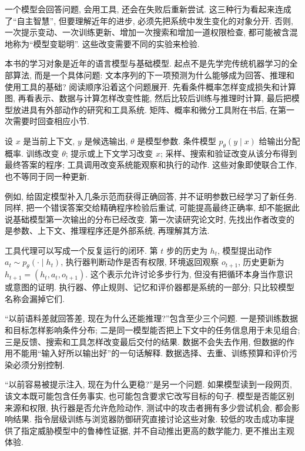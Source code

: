 \label{ch:route}
一个模型会回答问题, 会用工具, 还会在失败后重新尝试. 这三种行为看起来连成了“自主智慧”, 但要理解近年的进步, 必须先把系统中发生变化的对象分开. 否则, 一次提示变动、一次训练更新、增加一次搜索和增加一道权限检查, 都可能被含混地称为“模型变聪明”. 这些改变需要不同的实验来检验.

本书的学习对象是近年的语言模型与基础模型. 起点不是先学完传统机器学习的全部算法, 而是一个具体问题: 文本序列的下一项预测为什么能够成为回答、推理和使用工具的基础? 阅读顺序沿着这个问题展开. 先看条件概率怎样变成损失和计算图, 再看表示、数据与计算怎样改变性能, 然后比较后训练与推理时计算, 最后把模型放进具有外部动作的研究和工具系统. 矩阵、概率和微分工具附在书后, 在第一次需要时回查相应小节.

\begin{definition}
设 $x$ 是当前上下文, $y$ 是候选输出, $\theta$ 是模型参数. 条件模型 $p_\theta(y\mid x)$ 给输出分配概率. 训练改变 $\theta$; 提示或上下文学习改变 $x$; 采样、搜索和验证改变从该分布得到最终答案的程序; 工具调用改变系统能观察和执行的动作. 这些对象即使联合工作, 也不等同于同一种更新.
\end{definition}
例如, 给固定模型补入几条示范而获得正确回答, 并不证明参数已经学习了新任务. 同样, 把一个错误答案交给精确程序检验后重试, 可能提高最终正确率, 却不能据此说基础模型第一次输出的分布已经改变. 第一次读研究论文时, 先找出作者改变的是参数、上下文、推理程序还是外部系统, 再理解其方法.

工具代理可以写成一个反复运行的闭环. 第 $t$ 步的历史为 $h_t$, 模型提出动作 $a_t\sim p_\theta(\cdot\mid h_t)$, 执行器判断动作是否有权限, 环境返回观察 $o_{t+1}$, 历史更新为 $h_{t+1}=(h_t,a_t,o_{t+1})$. 这个表示允许讨论多步行为, 但没有把循环本身当作意识或意图的证明. 执行器、停止规则、记忆和评价器都是系统的一部分; 只比较模型名称会漏掉它们.

“以前语料差就回答差, 现在为什么还能推理?”包含至少三个问题. 一是预训练数据和目标怎样影响条件分布; 二是同一模型能否把上下文中的任务信息用于未见组合; 三是反馈、搜索和工具怎样改变最后交付的结果. 数据不会失去作用, 但数据的作用不能用“输入好所以输出好”的一句话解释. 数据选择、去重、训练预算和评价污染必须分别控制.

“以前容易被提示注入, 现在为什么更稳?”是另一个问题. 如果模型读到一段网页, 该文本既可能包含任务事实, 也可能包含要求它改写目标的句子. 模型是否能区别来源和权限, 执行器是否允许危险动作, 测试中的攻击者拥有多少尝试机会, 都会影响结果. 指令层级训练与浏览器防御研究直接讨论这些对象\cite{ih,ihblog,browserdefenses}. 较低的攻击成功率提供了指定威胁模型中的鲁棒性证据, 并不自动推出更高的数学能力, 更不推出主观体验.

